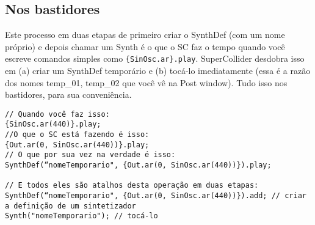 \subsection{Nos bastidores}

Este processo em duas etapas de primeiro criar o SynthDef (com um nome próprio) e depois chamar um Synth é o que o SC faz o tempo quando você escreve comandos simples como \texttt{\{SinOsc.ar\}.play}. SuperCollider desdobra isso em (a) criar um SynthDef temporário e (b) tocá-lo imediatamente (essa é a razão dos nomes temp\_01, temp\_02 que você vê na Post window). Tudo isso nos bastidores, para sua conveniência.
 
\begin{lstlisting}[style=SuperCollider-IDE, basicstyle=\scttfamily\footnotesize]
// Quando você faz isso:
{SinOsc.ar(440)}.play;
//O que o SC está fazendo é isso:
{Out.ar(0, SinOsc.ar(440))}.play;
// O que por sua vez na verdade é isso:
SynthDef(“nomeTemporario", {Out.ar(0, SinOsc.ar(440))}).play;

// E todos eles são atalhos desta operação em duas etapas:
SynthDef(“nomeTemporario", {Out.ar(0, SinOsc.ar(440))}).add; // criar a definição de um sintetizador
Synth("nomeTemporario"); // tocá-lo
\end{lstlisting}
